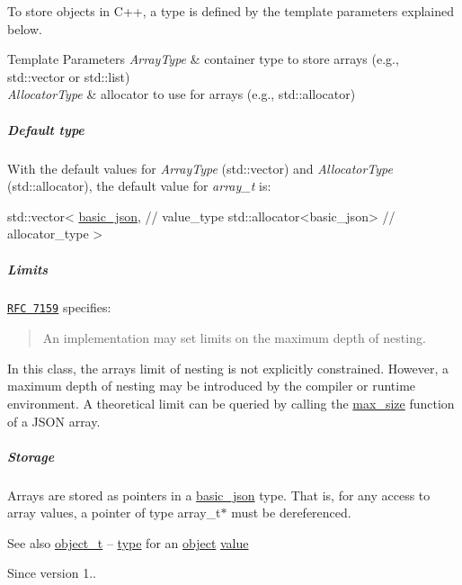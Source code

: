To store objects in C++, a type is defined by the template parameters explained below.


\begin{DoxyTemplParams}{Template Parameters}
{\em Array\+Type} & container type to store arrays (e.\+g., {\ttfamily std\+::vector} or {\ttfamily std\+::list}) \\
\hline
{\em Allocator\+Type} & allocator to use for arrays (e.\+g., {\ttfamily std\+::allocator})\\
\hline
\end{DoxyTemplParams}
\subparagraph*{Default type}

With the default values for {\itshape Array\+Type} ({\ttfamily std\+::vector}) and {\itshape Allocator\+Type} ({\ttfamily std\+::allocator}), the default value for {\itshape array\+\_\+t} is\+:


\begin{DoxyCode}
std::vector<
  \mbox{\hyperlink{classnlohmann_1_1basic__json_aed115142bd0c6c66c864700e0467df55}{basic\_json}}, \textcolor{comment}{// value\_type}
  std::allocator<basic\_json> \textcolor{comment}{// allocator\_type}
>
\end{DoxyCode}


\subparagraph*{Limits}

\href{http://rfc7159.net/rfc7159}{\tt R\+FC 7159} specifies\+: \begin{quote}
An implementation may set limits on the maximum depth of nesting. \end{quote}


In this class, the array\textquotesingle{}s limit of nesting is not explicitly constrained. However, a maximum depth of nesting may be introduced by the compiler or runtime environment. A theoretical limit can be queried by calling the \mbox{\hyperlink{classnlohmann_1_1basic__json_a2f47d3c6a441c57dd2be00449fbb88e1}{max\+\_\+size}} function of a J\+S\+ON array.

\subparagraph*{Storage}

Arrays are stored as pointers in a \mbox{\hyperlink{classnlohmann_1_1basic__json}{basic\+\_\+json}} type. That is, for any access to array values, a pointer of type {\ttfamily array\+\_\+t$\ast$} must be dereferenced.

\begin{DoxySeeAlso}{See also}
\mbox{\hyperlink{classnlohmann_1_1basic__json_a5e48a7893520e1314bf0c9723e26ea2a}{object\+\_\+t}} -- \mbox{\hyperlink{classnlohmann_1_1basic__json_a2b2d781d7f2a4ee41bc0016e931cadf7}{type}} for an \mbox{\hyperlink{classnlohmann_1_1basic__json_a31f84ee15c4690ff705bed74736d04c6}{object}} \mbox{\hyperlink{classnlohmann_1_1basic__json_adcf8ca5079f5db993820bf50036bf45d}{value}}
\end{DoxySeeAlso}
\begin{DoxySince}{Since}
version 1.. 
\end{DoxySince}
\mbox{\label{classnlohmann_1_1basic__json_a4c919102a9b4fe0d588af64801436082}} 
